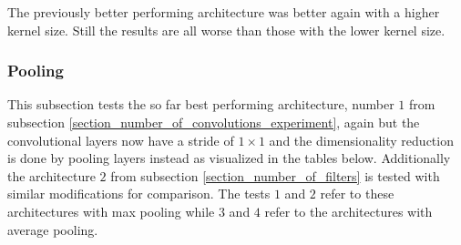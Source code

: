 The previously better performing architecture was better again with a higher kernel size. Still the results are 
all worse than those with the lower kernel size.

\subsubsection{Pooling}

This subsection tests the so far best performing architecture, number $1$ from subsection 
\ref{section_number_of_convolutions_experiment}, again but the convolutional layers now have a stride of $1\times1$
and the dimensionality reduction is done by pooling layers instead as visualized in the tables below. 
Additionally the architecture $2$ from subsection \ref{section_number_of_filters} is tested 
with similar modifications for comparison. The tests $1$ and $2$ refer to these architectures with max pooling
while $3$ and $4$ refer to the architectures with average pooling.


